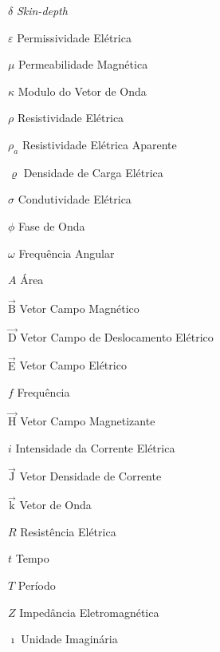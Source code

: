 \documentclass[12pt,twoside,oneright,a4paper,chapter=TITLE,english,brazil]{unipampa}
\newcommand{\en}[1]{\textit{#1}}
\newcommand{\vetor}[1]{\vec{\textrm{#1}}}
\begin{document}
\begin{simbolos}
    \begin{multicols}{2}
    \item[$\delta$]                 \en{Skin-depth}
    \item[$\varepsilon$]             Permissividade Elétrica
    \item[$\mu$]                     Permeabilidade Magnética
    \item[$\kappa$]                  Modulo do Vetor de Onda
    \item[$\rho$]                    Resistividade Elétrica
    \item[$\rho_a$]                  Resistividade Elétrica Aparente
    \item[$\varrho$]                 Densidade de Carga Elétrica
    \item[$\sigma$]                  Condutividade Elétrica
    \item[$\phi$]                    Fase de Onda
    \item[$\omega$]                  Frequência Angular
    \item[$A$]                       Área
    \item[$\vetor{B}$]               Vetor Campo Magnético
    \item[$\vetor{D}$]               Vetor Campo de Deslocamento Elétrico
    \item[$\vetor{E}$]               Vetor Campo Elétrico
    \item[$f$]                       Frequência
    \item[$\vetor{H}$]               Vetor Campo Magnetizante
    \item[$i$]                       Intensidade da Corrente Elétrica
    \item[$\vetor{J}$]               Vetor Densidade de Corrente
    \item[$\vetor{k}$]               Vetor de Onda
    \item[$R$]                       Resistência Elétrica
    \item[$t$]                       Tempo
    \item[$T$]                       Período
    \item[$Z$]                       Impedância Eletromagnética  
    \item[$\imath$]                  Unidade Imaginária

\end{multicols}
\end{simbolos}
\end{document}
